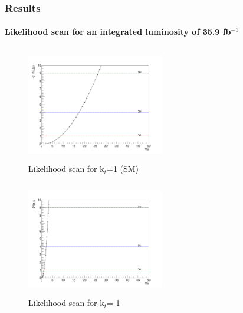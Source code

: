\documentclass[11pt]{beamer}
\begin{document}
\begin{frame}
\frametitle{Results}
\framesubtitle{Likelihood scan for an integrated luminosity of 35.9 fb$^{-1}$}
\begin{minipage}{0.5\textwidth}
	\begin{center}
		\begin{figure}
			\includegraphics[width=6cm,height=5cm]{figures/Likelihood.png}
			\caption*{Likelihood scan for k$_t$=1 (SM)}
		\end{figure}
	\end{center}
\end{minipage}\hfill
\begin{minipage}{0.5\textwidth}
	\begin{center}
		\begin{figure}
			\includegraphics[width=6cm,height=5cm]{figures/kt-1/Likelihood-kt-1.png}
			\caption*{Likelihood scan for k$_t$=-1}
		\end{figure}
	\end{center}
\end{minipage}
\end{frame}
\end{document}

